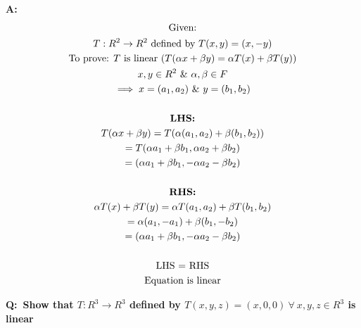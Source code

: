 \documentclass[english,course,fleqn]{lecture}
\newenvironment{qanda}{\setlength{\parindent}{0pt}}{\bigskip}
\newcommand{\Q}{\bigskip\bfseries Q:\ }
\newcommand{\A}{\par\textbf{A:} \normalfont}
\begin{document}
\begin{qanda}
	\A
	\begin{gather*}
		\text{Given:} \\
		T:R^{2} \rightarrow R^{2} \text{ defined by } T(x,y) = (x,-y)\\
		\text{To prove: $T$ is linear ($T(\alpha x + \beta y) = \alpha T(x) + \beta T (y)$)}\\
		x,y \in R^{2}~\&~\alpha, \beta \in F\\
		\implies x = (a_{1}, a_{2}) ~\&~ y = (b_{1}, b_{2})\\
		\\
		\text{\textbf{LHS:}}\\
		T(\alpha x + \beta y) = T(\alpha(a_{1}, a_{2}) + \beta(b_{1}, b_{2}))\\
		= T(\alpha a_{1} + \beta b_{1}, \alpha a_{2} + \beta b_{2})\\
		= (\alpha a_{1} + \beta b_{1}, -\alpha a_{2} - \beta b_{2})\\
		\\
		\text{\textbf{RHS:}}\\
		\alpha T(x) + \beta T(y) = \alpha T(a_{1}, a_{2}) + \beta T( b_{1}, b_{2})\\
		= \alpha(a_{1}, -a_{1}) + \beta (b_{1}, -b_{2})\\
		= (\alpha a_{1} + \beta b_{1}, -\alpha a_{2} - \beta b_{2}) \\
		\\
		\text{LHS $=$ RHS}\\
		\text{Equation is linear}
	\end{gather*}


	\Q Show that $T: R^{3} \rightarrow R^{3}$ defined by $T(x,y,z) = (x,0,0) ~\forall~ x,y,z \in R^{3}$ is linear


\end{qanda}
\end{document}

